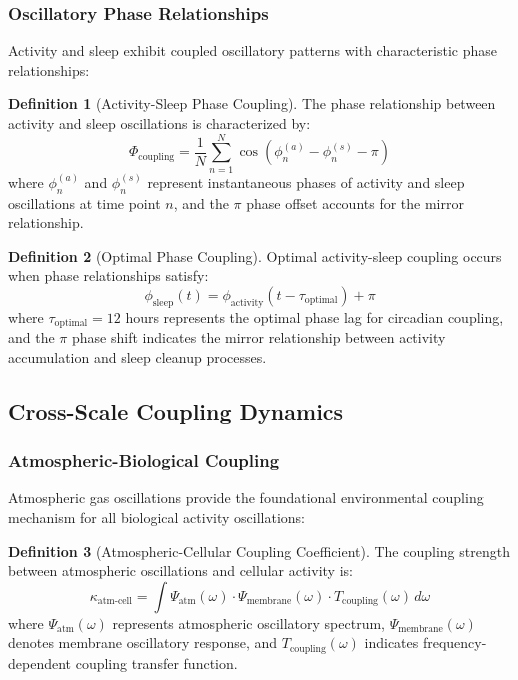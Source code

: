 \documentclass[12pt,a4paper]{article}
\theoremstyle{definition}
\newtheorem{definition}{Definition}[section]
\begin{document}
\subsubsection{Oscillatory Phase Relationships}

Activity and sleep exhibit coupled oscillatory patterns with characteristic phase relationships:

\begin{definition}[Activity-Sleep Phase Coupling]
The phase relationship between activity and sleep oscillations is characterized by:
\begin{equation}
\Phi_{\text{coupling}} = \frac{1}{N} \sum_{n=1}^{N} \cos(\phi_n^{(a)} - \phi_n^{(s)} - \pi)
\label{eq:phase_coupling}
\end{equation}
where $\phi_n^{(a)}$ and $\phi_n^{(s)}$ represent instantaneous phases of activity and sleep oscillations at time point $n$, and the $\pi$ phase offset accounts for the mirror relationship.
\end{definition}

\begin{definition}[Optimal Phase Coupling]
Optimal activity-sleep coupling occurs when phase relationships satisfy:
\begin{equation}
\phi_{\text{sleep}}(t) = \phi_{\text{activity}}(t - \tau_{\text{optimal}}) + \pi
\end{equation}
where $\tau_{\text{optimal}} = 12$ hours represents the optimal phase lag for circadian coupling, and the $\pi$ phase shift indicates the mirror relationship between activity accumulation and sleep cleanup processes.
\end{definition}

\subsection{Cross-Scale Coupling Dynamics}

\subsubsection{Atmospheric-Biological Coupling}

Atmospheric gas oscillations provide the foundational environmental coupling mechanism for all biological activity oscillations:

\begin{definition}[Atmospheric-Cellular Coupling Coefficient]
The coupling strength between atmospheric oscillations and cellular activity is:
\begin{equation}
\kappa_{\text{atm-cell}} = \int \Psi_{\text{atm}}(\omega) \cdot \Psi_{\text{membrane}}(\omega) \cdot T_{\text{coupling}}(\omega) \, d\omega
\end{equation}
where $\Psi_{\text{atm}}(\omega)$ represents atmospheric oscillatory spectrum, $\Psi_{\text{membrane}}(\omega)$ denotes membrane oscillatory response, and $T_{\text{coupling}}(\omega)$ indicates frequency-dependent coupling transfer function.
\end{definition}
\end{document}
